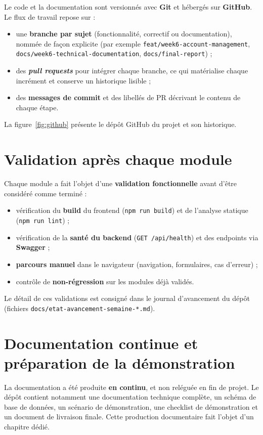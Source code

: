 Le code et la documentation sont versionnés avec \textbf{Git} et hébergés sur
\textbf{GitHub}. Le flux de travail repose sur :

\begin{itemize}
  \item une \textbf{branche par sujet} (fonctionnalité, correctif ou
        documentation), nommée de façon explicite (par exemple
        \texttt{feat/week6-account-management},
        \texttt{docs/week6-technical-documentation},
        \texttt{docs/final-report}) ;
  \item des \textbf{\emph{pull requests}} pour intégrer chaque branche, ce qui
        matérialise chaque incrément et conserve un historique lisible ;
  \item des \textbf{messages de commit} et des libellés de PR décrivant le
        contenu de chaque étape.
\end{itemize}

La figure~\ref{fig:github} présente le dépôt GitHub du projet et son
historique.

\section{Validation après chaque module}

Chaque module a fait l'objet d'une \textbf{validation fonctionnelle} avant
d'être considéré comme terminé :

\begin{itemize}
  \item vérification du \textbf{build} du frontend (\texttt{npm run build}) et
        de l'analyse statique (\texttt{npm run lint}) ;
  \item vérification de la \textbf{santé du backend}
        (\texttt{GET /api/health}) et des endpoints via \textbf{Swagger} ;
  \item \textbf{parcours manuel} dans le navigateur (navigation, formulaires,
        cas d'erreur) ;
  \item contrôle de \textbf{non-régression} sur les modules déjà validés.
\end{itemize}

Le détail de ces validations est consigné dans le journal d'avancement du
dépôt (fichiers \texttt{docs/etat-avancement-semaine-*.md}).

\section{Documentation continue et préparation de la démonstration}

La documentation a été produite \textbf{en continu}, et non reléguée en fin de
projet. Le dépôt contient notamment une documentation technique complète, un
schéma de base de données, un scénario de démonstration, une checklist de
démonstration et un document de livraison finale. Cette production
documentaire fait l'objet d'un chapitre dédié.
